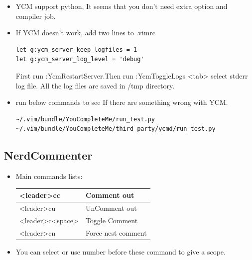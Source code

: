 \documentclass[a4paper,12pt,twoside]{book}
\begin{document}
\begin{itemize}
\begin{itemize}
\begin{itemize}
\item YCM support python, It seems that you don't need extra option and compiler job.		

\item If YCM doesn't work, add two lines to .vimrc 
\begin{verbatim}
let g:ycm_server_keep_logfiles = 1
let g:ycm_server_log_level = 'debug'
\end{verbatim}

First run :YcmRestartServer.Then run :YcmToggleLogs <tab> select stderr log file. All the log files are saved in /tmp directory. 



\item run below commands to see If there are something wrong with YCM. 	
\begin{verbatim}
~/.vim/bundle/YouCompleteMe/run_test.py
~/.vim/bundle/YouCompleteMe/third_party/ycmd/run_test.py
\end{verbatim}
\end{itemize}

\subsection{NerdCommenter}
\begin{itemize}
		\item Main commands lists:  

\begin{tabular}{p{}|p{}}
		\hline 
		[count]<leader>cc & Comment out \\
		\hline 
		[count]<leader>cu & UnComment out \\
		\hline 
		[count]<leader>c<space> & Toggle Comment \\
		\hline
		[count]<leader>cn & Force nest comment \\
\end{tabular}
\item You can select or use number before these command to give a scope. 
\end{itemize}


\end{itemize}
\end{itemize}
\end{document}

